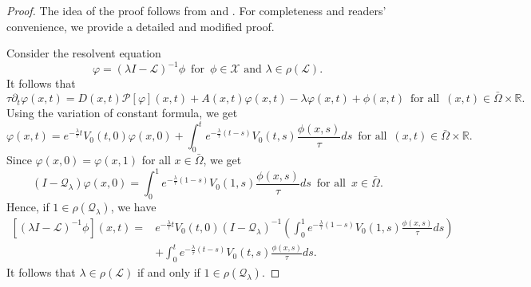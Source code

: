 \documentclass[11pt,reqno]{amsart}
\numberwithin{equation}{section}
\begin{document}
\begin{proof}
The idea of the proof follows from \cite[Proposition 3.6]{DKR} and \cite[Proposition 2.10]{Feng}. For completeness and readers' convenience, we provide a detailed and modified proof.

Consider the resolvent equation
\begin{equation*}
\varphi=(\lambda I- \mathcal{L})^{-1}\phi\enspace\text{for}\enspace\phi\in\mathcal{X} \text{ and }\lambda\in\rho(\mathcal{L}).
\end{equation*}
%
It follows that
\begin{equation*}
\tau \partial_{t} \varphi(x,t) = D(x,t)\mathcal{P}[\varphi](x,t) + A(x,t)\varphi(x,t)-\lambda\varphi(x,t) + \phi(x,t)
\enspace \text{for all} \enspace (x,t)\in \bar{\Omega} \times \mathbb{R}.
\end{equation*}
%
Using the variation of constant formula, we get
\begin{equation*}
\varphi(x,t) = e^{-\frac{\lambda}{\tau}t}V_{0}(t,0)\varphi(x,0)
+ \int_{0}^{t} e^{-\frac{\lambda}{\tau}(t-s)}V_{0}(t,s)\frac{\phi(x,s)}{\tau} ds
\enspace \text{for all} \enspace (x,t)\in \bar{\Omega} \times \mathbb{R}.
\end{equation*}
%
Since $\varphi(x,0)=\varphi(x,1)$ for all $x\in\bar\Omega$, we get
\begin{equation*}
\left( I-\mathcal{Q}_{\lambda} \right)\varphi(x,0)=\int_{0}^{1}e^{-\frac{\lambda}{\tau}(1-s)}V_{0}(1,s)\frac{\phi(x,s)}{\tau} ds
\enspace \text{for all} \enspace x\in \bar{\Omega}.
\end{equation*}
%
Hence, if $1\in\rho(\mathcal{Q}_{\lambda})$, we have
\begin{equation}\label{2-1}
\begin{aligned}
\left[ (\lambda I - \mathcal{L})^{-1}\phi \right](x,t)
=&
e^{-\frac{\lambda}{\tau} t}V_{0}(t,0) (I-\mathcal{Q}_{\lambda})^{-1}
\left( \int_{0}^{1} e^{-\frac{\lambda}{\tau}(1-s)} V_{0}(1,s) \frac{\phi(x,s)}{\tau} ds \right)\\
&+ \int_{0}^{t} e^{-\frac{\lambda}{\tau}(t-s)}V_{0}(t,s)\frac{\phi(x,s)}{\tau} ds.
\end{aligned}
\end{equation}
It follows that $\lambda\in\rho(\mathcal{L})$ if and only if $1\in\rho(\mathcal{Q}_{\lambda})$.



\end{proof}
\end{document}
